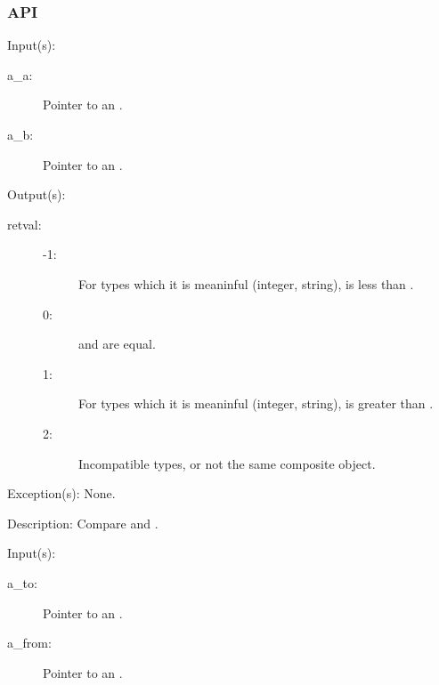 \subsubsection{API}
\begin{capi}
\label{nxo_compare}
	\begin{capilist}
	\item[Input(s): ]
		\begin{description}\item[]
		\item[a\_a: ]
			Pointer to an .
		\item[a\_b: ]
			Pointer to an .
		\end{description}
	\item[Output(s): ]
		\begin{description}\item[]
		\item[retval: ]
			\begin{description}\item[]
			\item[-1: ]
				For types which it is meaninful (integer,
				string),  is less than .
			\item[0: ]
				 and  are equal.
			\item[1: ]
				For types which it is meaninful (integer,
				string),  is greater than
				.
			\item[2: ]
				Incompatible types, or not the same composite
				object.
			\end{description}
		\end{description}
	\item[Exception(s): ] None.
	\item[Description: ]
		Compare  and .
	\end{capilist}
\label{nxo_dup}
	\begin{capilist}
	\item[Input(s): ]
		\begin{description}\item[]
		\item[a\_to: ]
			Pointer to an \classname{nxo}.
		\item[a\_from: ]
			Pointer to an \classname{nxo}.
		\end{description}

\end{capilist}
\end{capi}
